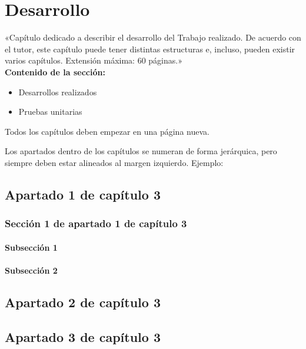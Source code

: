 \chapter{Desarrollo}
«Capítulo dedicado a describir el desarrollo del Trabajo realizado. De acuerdo con el
tutor, este capítulo puede tener distintas estructuras e, incluso, pueden existir varios
capítulos. Extensión máxima: 60 páginas.»\\

\textbf{Contenido de la sección:}
\begin{itemize}
    \item Desarrollos realizados
    \item Pruebas unitarias
\end{itemize}

Todos los capítulos deben empezar en una página nueva.

Los apartados dentro de los capítulos se numeran de forma jerárquica, pero siempre
deben estar alineados al margen izquierdo. Ejemplo:

\section{Apartado 1 de capítulo 3}
\subsection{Sección 1 de apartado 1 de capítulo 3}
\subsubsection{Subsección 1}
\subsubsection{Subsección 2}
\section{Apartado 2 de capítulo 3}
\section{Apartado 3 de capítulo 3}

